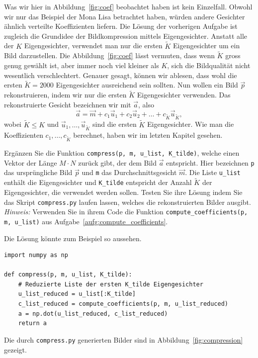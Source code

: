 Was wir hier in Abbildung~\ref{fig:coef} beobachtet haben ist kein Einzelfall.
Obwohl wir nur das Beispiel der Mona Lisa betrachtet haben, würden andere Gesichter ähnlich verteilte Koeffizienten liefern.
Die Lösung der vorherigen Aufgabe ist zugleich die Grundidee der Bildkompression mittels Eigengesichter.
Anstatt alle der $K$ Eigengesichter, verwendet man nur die ersten $\tilde K$ Eigengesichter um ein Bild darzustellen.
Die Abbildung~\ref{fig:coef} lässt vermuten, dass wenn $\tilde K$ gross genug gewählt ist, aber immer noch viel kleiner als $K$, sich die Bildqualität nicht wesentlich verschlechtert.
Genauer gesagt, können wir ablesen, dass wohl die ersten $\tilde K=2000$ Eigengesichter ausreichend sein sollten.
Nun wollen ein Bild $\vec p$ rekonstruieren, indem wir nur die ersten $\tilde K$ Eigengesichter verwenden.
Das rekonstruierte Gesicht bezeichnen wir mit $\vec a$, also
\begin{equation*}
	\vec a=\vec m+c_1\vec u_1+c_2\vec u_2+\ldots+c_{\tilde K}\vec u_{\tilde K},
\end{equation*}
wobei $\tilde K\leq K$ und $\vec u_1,\ldots,\vec u_{\tilde K}$ sind die ersten $\tilde K$ Eigengesichter.
Wie man die Koeffizienten $c_1,\ldots,c_{\tilde K}$ berechnet, haben wir im letzten Kapitel gesehen.
\begin{aufgabe} \label{aufg:compression}
	Ergänzen Sie die Funktion \texttt{compress(p, m, u\_list, K\_tilde)}, welche einen Vektor der Länge $M\cdot N$ zurück gibt, der dem Bild $\vec a$ entspricht.
	Hier bezeichnen \texttt{p} das ursprüngliche Bild $\vec p$ und \texttt{m} das Durchschnittsgesicht $\vec m$.
	Die Liste \texttt{u\_list} enthält die Eigengesichter und \texttt{K\_tilde} entspricht der Anzahl $\tilde K$ der Eigengesichter, die verwendet werden sollen.
	Testen Sie ihre Lösung indem Sie das Skript \texttt{compress.py} laufen lassen, welches die rekonstruierten Bilder ausgibt.
	\textit{Hinweis:} Verwenden Sie in ihrem Code die Funktion \texttt{compute\_coefficients(p, m, u\_list)} aus Aufgabe~\ref{aufg:compute_coefficients}.
\end{aufgabe}
\begin{losung*}
	Die Lösung könnte zum Beispiel so aussehen.
\begin{lstlisting}[style=python]
import numpy as np

def compress(p, m, u_list, K_tilde):
	# Reduzierte Liste der ersten K_tilde Eigengesichter
	u_list_reduced = u_list[:K_tilde]
	c_list_reduced = compute_coefficients(p, m, u_list_reduced)
	a = np.dot(u_list_reduced, c_list_reduced)
	return a
\end{lstlisting}
Die durch \texttt{compress.py} generierten Bilder sind in Abbildung~\ref{fig:compression} gezeigt.
\end{losung*}
